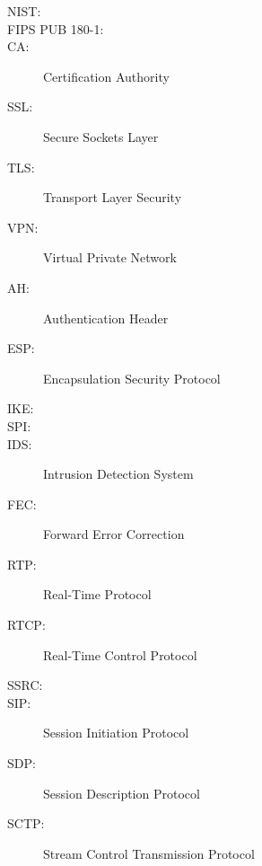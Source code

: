 \begin{description}
	\item[NIST:]
	\item[FIPS PUB 180-1:]
	\item[CA:] Certification Authority
	\item[SSL:] Secure Sockets Layer
	\item[TLS:] Transport Layer Security
	\item[VPN:] Virtual Private Network
	\item[AH:] Authentication Header
	\item[ESP:] Encapsulation Security Protocol
	\item[IKE:]
	\item[SPI:]
	\item[IDS:] Intrusion Detection System
	\item[FEC:] Forward Error Correction
	\item[RTP:] Real-Time Protocol
	\item[RTCP:] Real-Time Control Protocol
	\item[SSRC:]
	\item[SIP:] Session Initiation Protocol
	\item[SDP:] Session Description Protocol
	\item[SCTP:] Stream Control Transmission Protocol
\end{description}